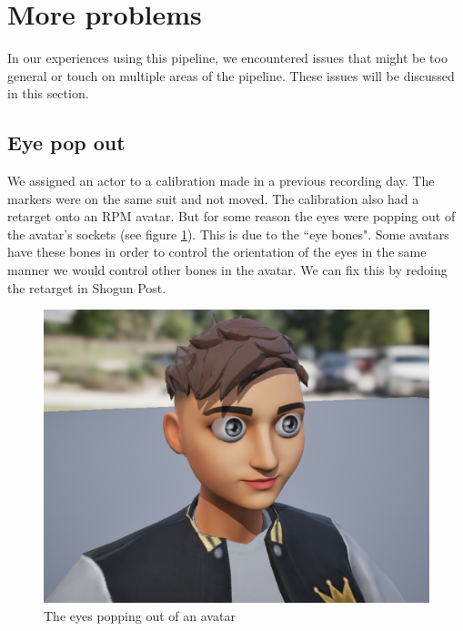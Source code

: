 \documentclass{uva-inf-article}
\begin{document}
\section{More problems}
In our experiences using this pipeline, we encountered issues that might be too general or touch on multiple areas of the pipeline. These issues will be discussed in this section.

\subsection{Eye pop out}
We assigned an actor to a calibration made in a previous recording day. The markers were on the same suit and not moved. The calibration also had a retarget onto an RPM avatar. But for some reason the eyes were popping out of the avatar's sockets (see figure \ref{fig:eyepopout}). This is due to the ``eye bones". Some avatars have these bones in order to control the orientation of the eyes in the same manner we would control other bones in the avatar. We can fix this by redoing the retarget in Shogun Post.

\begin{figure}[hbt!]
    \centering
    \includegraphics[width=\textwidth]{imgs/eye-pop-out.png}
    \caption{The eyes popping out of an avatar}
    \label{fig:eyepopout}
\end{figure}


\printbibliography



\end{document}
